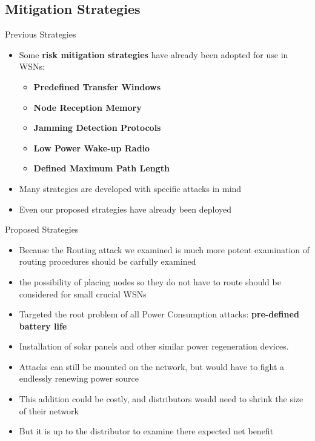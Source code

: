 \documentclass{beamer}
\begin{document}
\subsection{Mitigation Strategies}

\begin{frame}{Previous Strategies}

\begin{itemize}

	\item Some \textbf{risk mitigation strategies} have already been adopted for use in WSNs:
	\begin{itemize}
		\item \textbf{Predefined Transfer Windows}
		\item \textbf{Node Reception Memory}
		\item \textbf{Jamming Detection Protocols}
		\item \textbf{Low Power Wake-up Radio}
		\item \textbf{Defined Maximum Path Length}
	\end{itemize}
	\item Many strategies are developed with specific attacks in mind
	\item Even our proposed strategies have already been deployed
	
\end{itemize}

\end{frame}

\begin{frame}{Proposed Strategies}

\begin{itemize}

	\item Because the Routing attack we examined is much more potent examination of routing procedures should be carfully examined
	\item the possibility of placing nodes so they do not have to route should be considered for small crucial WSNs
	\item Targeted the root problem of all Power Consumption attacks: \textbf{pre-defined battery life}
	\item Installation of solar panels and other similar power regeneration devices.
	\item Attacks can still be mounted on the network, but would have to fight a endlessly renewing power source 
	\item This addition could be costly, and distributors would need to shrink the size of their network
	\item But it is up to the distributor to examine there expected net benefit
	
\end{itemize}

\end{frame}
\end{document}
